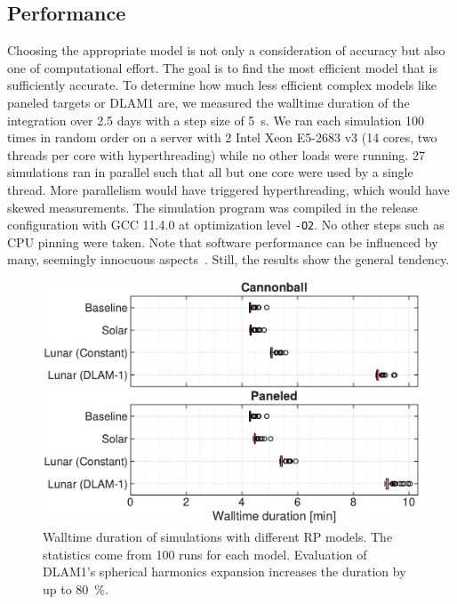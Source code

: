 







\subsection{Performance}
Choosing the appropriate model is not only a consideration of accuracy but also one of computational effort. The goal is to find the most efficient model that is sufficiently accurate. To determine how much less efficient complex models like paneled targets or \gls{DLAM1} are, we measured the walltime duration of the integration over 2.5 days with a step size of \qty{5}{\s}. We ran each simulation 100 times in random order on a server with 2 Intel Xeon E5-2683 v3 (14 cores, two threads per core with hyperthreading) while no other loads were running. 27 simulations ran in parallel such that all but one core were used by a single thread. More parallelism would have triggered hyperthreading, which would have skewed measurements. The simulation program was compiled in the release configuration with GCC 11.4.0 at optimization level \texttt{-O2}. No other steps such as CPU pinning were taken. Note that software performance can be influenced by many, seemingly innocuous aspects~\cite{Mytkowicz2009}. Still, the results show the general tendency.

\begin{figure}[t]
    \centering
    \includegraphics[width=\linewidth]{figures/plots/performance.pdf}
    \caption{Walltime duration of simulations with different \gls{RP} models. The statistics come from 100 runs for each model. Evaluation of \gls{DLAM1}'s spherical harmonics expansion increases the duration by up to \qty{80}{\percent}.}
    \label{fig:performance}
\end{figure}

